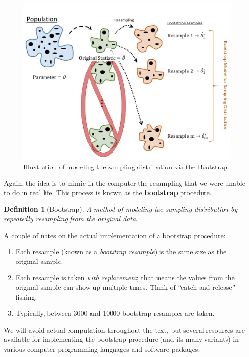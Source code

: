 \documentclass[
]{book}
\providecommand{\tightlist}{%
  \setlength{\itemsep}{0pt}\setlength{\parskip}{0pt}}
\theoremstyle{plain}
\theoremstyle{mydefn}
\newtheorem{definition}{Definition}[chapter]
\theoremstyle{myexmpl}
\theoremstyle{remark}
\begin{document}
\begin{figure}

{\centering \includegraphics[width=0.8\linewidth]{./images/SamplingDistns-Bootstrap} 

}

\caption{Illustration of modeling the sampling distribution via the Bootstrap.}\label{fig:samplingdistns-bootstrap}
\end{figure}

Again, the idea is to mimic in the computer the resampling that we were unable to do in real life. This process is known as the \textbf{bootstrap} procedure.

\begin{definition}[Bootstrap]
\protect\hypertarget{def:defn-bootstrap}{}{\label{def:defn-bootstrap} {} }A method of modeling the sampling distribution by repeatedly resampling from the original data.
\end{definition}

A couple of notes on the actual implementation of a bootstrap procedure:

\begin{enumerate}
\def\labelenumi{\arabic{enumi}.}
\tightlist
\item
  Each resample (known as a \emph{bootstrap resample}) is the same size as the original sample.
\item
  Each resample is taken \emph{with replacement}; that means the values from the original sample can show up multiple times. Think of ``catch and release'' fishing.
\item
  Typically, between 3000 and 10000 bootstrap resamples are taken.
\end{enumerate}

We will avoid actual computation throughout the text, but several resources are available for implementing the bootstrap procedure (and its many variants) in various computer programming languages and software packages.
\end{document}
